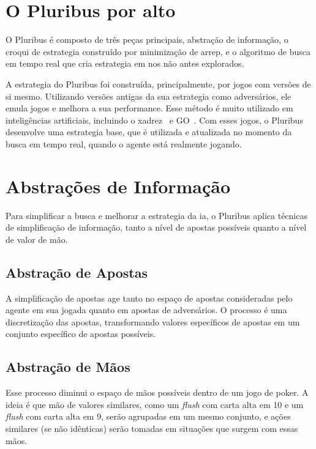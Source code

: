 \documentclass[twocolumn]{article}
\theoremstyle{mytheoremstyle}
\theoremstyle{mytheoremstyle}
\theoremstyle{myproblemstyle}
\begin{document}

    \section{O Pluribus por alto} %
    \label{sec:O Pluribus por alto}
        O Pluribus é composto de três peças principais, abstração de informação, o croqui de \gls{estrategia} construído por minimização de \gls{arrep},
        e o algoritmo de busca em tempo real que cria \gls{estrategia} em \glspl{no} não antes explorados.

        A \gls{estrategia} do Pluribus foi construída, principalmente, por jogos com versões de si mesmo. Utilizando versões antigas
        da sua \gls{estrategia} como adversários, ele emula jogos e melhora a sua performance.
        Esse método é muito utilizado em inteligências
        artificiais, incluindo o xadrez~\cite{DBLP:journals/corr/abs-1712-01815} e GO~\cite{Silver2016}. Com esses jogos, o Pluribus desenvolve uma \gls{estrategia}
        base, que é utilizada e atualizada no momento da busca em tempo real, quando o agente está realmente jogando.

    \section{Abstrações de Informação } %
    \label{sec:Simplificação de Informação }
        Para simplificar a busca e melhorar a \gls{estrategia} da \acrshort{ia}, o Pluribus aplica técnicas de simplificação de informação, tanto a nível de apostas
        possíveis quanto a nível de valor de mão.

        \subsection{Abstração de Apostas} %
        \label{sub:Simplificação de Apostas}

            A simplificação de apostas age tanto no espaço de apostas consideradas pelo agente em sua jogada quanto em apostas de adversários. O processo
            é uma discretização das apostas, transformando valores específicos de apostas em um conjunto específico de apostas possíveis.


        \subsection{Abstração de Mãos} %
        \label{sub:Simplificação de Mãos}
            Esse processo diminui o espaço de mãos possíveis dentro de um jogo de poker. A ideia é que mão de valores similares, como um \emph{flush}
            com carta alta em 10 e um \emph{\gls{flush}} com carta alta em 9, serão agrupadas em um mesmo conjunto, e ações similares (se não idênticas) serão
            tomadas em situações que surgem com essas mãos.
\end{document}
